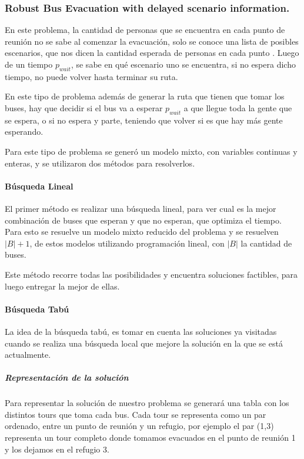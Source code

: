 \documentclass[letter, 10pt]{article}
\begin{document}
\subsubsection{Robust Bus Evacuation with delayed scenario information.}
En este problema, la cantidad de personas que se encuentra en cada punto de reunión no se sabe al comenzar la evacuación, solo se conoce una lista de posibles escenarios, que nos dicen la cantidad esperada de personas en cada punto \cite{goerigk2012robust}. Luego de un tiempo $p_{wait}$, se sabe en qué escenario uno se encuentra, si no espera dicho tiempo, no puede volver hasta terminar su ruta. 

En este tipo de problema además de generar la ruta que tienen que tomar los buses, hay que decidir si el bus va a esperar $p_{wait}$ a que llegue toda la gente que se espera, o si no espera y parte, teniendo que volver si es que hay más gente esperando.

Para este tipo de problema se generó un modelo mixto, con variables continuas y enteras, y se utilizaron dos métodos para resolverlos.

\paragraph{Búsqueda Lineal}
El primer método es realizar una búsqueda lineal, para ver cual es la mejor combinación de buses que esperan y que no esperan, que optimiza el tiempo. Para esto se resuelve un modelo mixto reducido del problema y se resuelven $|B| + 1$, de estos modelos utilizando programación lineal, con $|B|$ la cantidad de buses.

Este método recorre todas las posibilidades y encuentra soluciones factibles, para luego entregar la mejor de ellas.

\paragraph{Búsqueda Tabú}

La idea de la búsqueda tabú, es tomar en cuenta las soluciones ya visitadas cuando se realiza una búsqueda local que mejore la solución en la que se está actualmente.

\subparagraph{Representación de la solución}

Para representar la solución de nuestro problema se generará una tabla con los distintos tours que toma cada bus. Cada tour se representa como un par ordenado, entre un punto de reunión y un refugio, por ejemplo el par (1,3) representa un tour completo donde tomamos evacuados en el punto de reunión 1 y los dejamos en el refugio 3.
\end{document}
